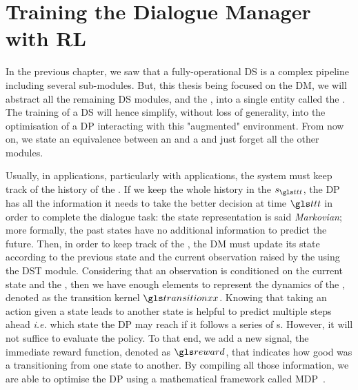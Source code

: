 \chapter{Training the Dialogue Manager with RL}
\label{chapter:dm-rl}

In the previous chapter, we saw that a fully-operational \acrfull{DS} is a complex pipeline including several sub-modules. But, this thesis being focused on the \acrfull{DM},
we will abstract all the remaining \acrshort{DS} modules, and the , into a single entity called the .
The training of a \acrshort{DS} will hence simplify, without loss of generality, into the optimisation of a \acrfull{DP} interacting with this "augmented" environment.
%
From now on, we state an equivalence between an  and a  and just forget all the other modules.

Usually, in  applications, particularly with   applications, the system must keep track of the history of the . If we keep the whole  history in the  
$s_{\indextransition}$, %
the \gls{DP} has all the information it needs to take the better decision at time $\indextransition$ in order to complete the dialogue task:
the  state representation is said \textit{Markovian}; more formally, the past states have no additional information to predict the future. Then, in order to keep track of the , the \gls{DM} must update its state according to the previous state and the current observation raised by the  using the \acrfull{DST} module. Considering that an observation is conditioned on the current state and the , then we have enough elements to represent the dynamics of the , denoted as the transition kernel $\transition$.
Knowing that taking an action given a state leads to another state is helpful to predict multiple steps ahead \textit{i.e.} which state the \gls{DP} may reach if it follows a series of s. However, it will not suffice to evaluate the policy. To that end, we add a new signal, the immediate reward function, denoted as $\reward$, that indicates how good was a  transitioning from one state to another. By compiling all those information, we are able to optimise the \gls{DP} using a mathematical framework called \acrlong{MDP}~\parencite{bellman57}.

